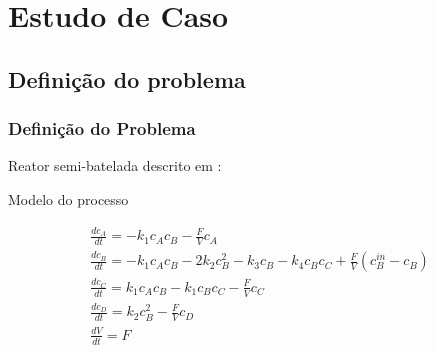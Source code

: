 \documentclass{beamer}
\begin{document}
\section{Estudo de Caso}
\subsection{Definição do problema}

\begin{frame}
	\frametitle{Definição do Problema}
	Reator semi-batelada descrito em \cite{chachuat2009}:
	
    \qquad	{} \quad
	 \quad
	 \quad
	 \quad
	
	\begin{block}{Modelo do processo}
	\begin{small}
		\begin{eqnarray}
			\label{eq:models}	\frac{dc_A}{dt} = -k_1c_Ac_B - \frac{F}{V}c_A \\
			\frac{dc_B}{dt} = -k_1c_Ac_B - 2k_2c_B^2 - k_3c_B - k_4c_Bc_C + \frac{F}{V}(c_B^{in} - c_B) \\
			\frac{dc_C}{dt} = k_1c_Ac_B -k_1c_Bc_C - \frac{F}{V}c_C \\
			\frac{dc_D}{dt} = k_2c_B^2 - \frac{F}{V}c_D \\
			\frac{dV}{dt} = F
			\label{eq:modelf}
		\end{eqnarray}
	\end{small}
	\end{block}

\end{frame}

\end{document}
